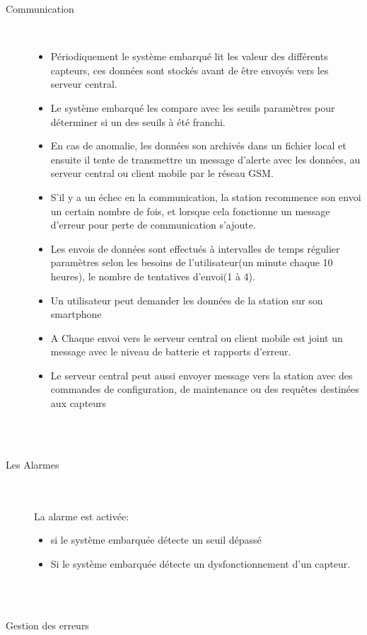 \documentclass [a4paper] {report}
\begin{document}
\begin{description}
\item [Communication]\hfill\\
	\begin{itemize}
	\item Périodiquement le système embarqué lit les valeur des différents capteurs, ces données sont stockés avant de être envoyés vers les serveur central.
	\item Le système embarqué les compare avec les seuils paramètres pour déterminer si un des seuils à été franchi. 
	\item En cas de anomalie, les données son archivés dans un fichier local et ensuite il tente de transmettre un message d'alerte avec les données, au serveur central ou client mobile par le réseau GSM. 
	\item S'il y a un échec en la communication, la station recommence son envoi un certain nombre de fois, et lorsque cela fonctionne un message d'erreur pour perte de communication s'ajoute.
	\item Les envois de données sont effectués à intervalles de temps régulier paramètres selon les besoins de l'utilisateur(un minute chaque 10 heures), le nombre de tentatives d'envoi(1 à 4).
	\item Un utilisateur peut demander les données de la station sur son smartphone
	\item A Chaque envoi vers le serveur central ou client mobile est joint un message avec le niveau de batterie et rapports d'erreur.
	\item Le serveur central peut aussi envoyer message vers la station avec des commandes de configuration, de maintenance ou des requêtes destinées aux capteurs \\\\
\end{itemize}\\
\item [Les Alarmes]\hfill\\
	\\ La alarme est activée:
	\begin{itemize}
		\item si le système embarquée détecte un seuil dépassé
		\item Si le système embarquée détecte un dysfonctionnement d'un capteur. \\\\
	\end{itemize}\\
\item [Gestion des erreurs]\hfill\\

\end{description}
\end{document}

